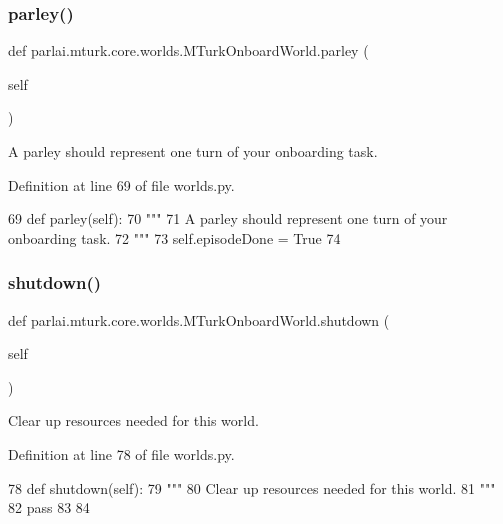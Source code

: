 \subsubsection{\texorpdfstring{parley()}{parley()}}
{\footnotesize\ttfamily def parlai.\+mturk.\+core.\+worlds.\+M\+Turk\+Onboard\+World.\+parley (\begin{DoxyParamCaption}\item[{}]{self }\end{DoxyParamCaption})}

\begin{DoxyVerb}A parley should represent one turn of your onboarding task.
\end{DoxyVerb}
 

Definition at line 69 of file worlds.\+py.


\begin{DoxyCode}
69     \textcolor{keyword}{def }parley(self):
70         \textcolor{stringliteral}{"""}
71 \textcolor{stringliteral}{        A parley should represent one turn of your onboarding task.}
72 \textcolor{stringliteral}{        """}
73         self.episodeDone = \textcolor{keyword}{True}
74 
\end{DoxyCode}
\mbox{\label{classparlai_1_1mturk_1_1core_1_1worlds_1_1MTurkOnboardWorld_abf47662333aebdff9d3e2224e0f0a2bc}} 
\subsubsection{\texorpdfstring{shutdown()}{shutdown()}}
{\footnotesize\ttfamily def parlai.\+mturk.\+core.\+worlds.\+M\+Turk\+Onboard\+World.\+shutdown (\begin{DoxyParamCaption}\item[{}]{self }\end{DoxyParamCaption})}

\begin{DoxyVerb}Clear up resources needed for this world.
\end{DoxyVerb}
 

Definition at line 78 of file worlds.\+py.


\begin{DoxyCode}
78     \textcolor{keyword}{def }shutdown(self):
79         \textcolor{stringliteral}{"""}
80 \textcolor{stringliteral}{        Clear up resources needed for this world.}
81 \textcolor{stringliteral}{        """}
82         \textcolor{keywordflow}{pass}
83 
84 
\end{DoxyCode}


